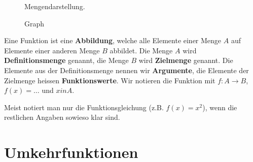 \begin{figure}[htb]
	\centering
	\begin{minipage}{0.4\textwidth}
		\centering
	\caption{Mengendarstellung.}
	\label{figure-funktion-mengendarstellung}
	\end{minipage}
	\hfill
	\begin{minipage}{0.5\textwidth}
		\centering
  		\caption{Graph}
  		\label{figure-funktion-graph}
	\end{minipage}
\end{figure}

\begin{definition}[Funktion]
	Eine Funktion ist eine \textbf{Abbildung}, welche alle Elemente einer Menge $A$ auf Elemente einer anderen Menge $B$ abbildet. Die Menge $A$ wird \textbf{Definitionsmenge} genannt, die Menge $B$ wird \textbf{Zielmenge} genannt. Die Elemente aus der Definitionsmenge nennen wir \textbf{Argumente}, die Elemente der Zielmenge heissen \textbf{Funktionswerte}. Wir notieren die Funktion mit $f: A \rightarrow B$, $f(x) = \dots$ und $x in A$.
\end{definition}

Meist notiert man nur die Funktionsgleichung (z.B. $f(x) = x^2$), wenn die restlichen Angaben sowieso klar sind.

\section{Umkehrfunktionen}


